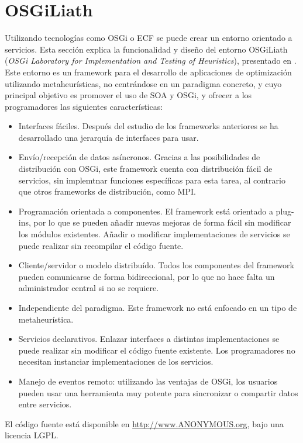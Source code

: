 \documentclass[runningheads]{llncs}
\begin{document}
\section{OSGiLiath}
\label{sec:osgiliath}
Utilizando tecnologías como OSGi o ECF se puede crear un entorno orientado a servicios. Esta sección explica la funcionalidad y diseño del entorno OSGiLiath ({\em OSGi Laboratory for Implementation and Testing of Heuristics}), presentado en \cite{OSGILIATHNICSO}. Este entorno es un framework para el desarrollo de aplicaciones de optimización utilizando metaheurísticas, no centrándose en un paradigma concreto, y cuyo principal objetivo es promover el uso de SOA y OSGi, y ofrecer a los programadores las siguientes características:


\begin{itemize}
\item Interfaces fáciles. Después del estudio de los frameworks anteriores se ha desarrollado una jerarquía de interfaces para usar. 
\item Envío/recepción de datos asíncronos. Gracias a las posibilidades de distribución con OSGi, este framework cuenta con distribución fácil de servicios, sin implemtnar funciones específicas para esta tarea, al contrario que otros frameworks de distribución, como MPI.
\item Programación orientada a componentes. El framework está orientado a plug-ins, por lo que se pueden añadir nuevas mejoras de forma fácil sin modificar los módulos existentes. Añadir o modificar implementaciones de servicios se puede realizar sin recompilar el código fuente.
\item Cliente/servidor o modelo distribuído. Todos los componentes del framework pueden comunicarse de forma bidireccional, por lo que no hace falta un administrador central si no se requiere.
\item Independiente del paradigma. Este framework no está enfocado en un tipo de metaheurística.
\item Servicios declarativos. Enlazar interfaces a distintas implementaciones se puede realizar sin modificar el código fuente existente. Los programadores no necesitan instanciar implementaciones de los servicios.
\item Manejo de eventos remoto: utilizando las ventajas de OSGi, los usuarios pueden usar una herramienta muy potente para sincronizar o compartir datos entre servicios.
\end{itemize}

El código fuente está disponible en \url{http://www.ANONYMOUS.org}, bajo una licencia LGPL.
\end{document}
